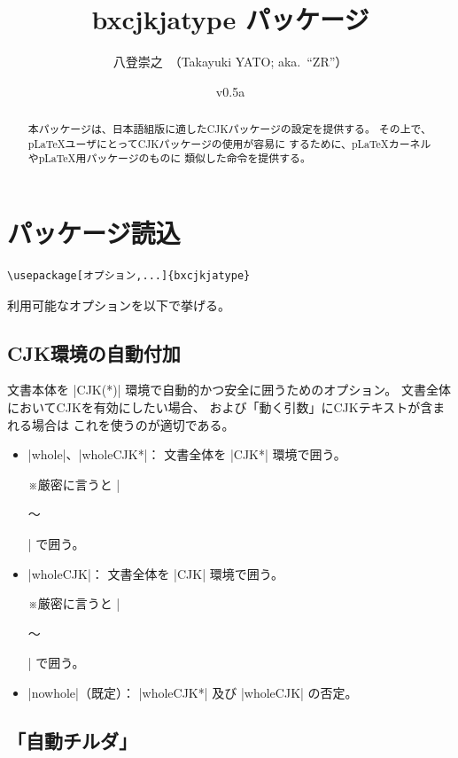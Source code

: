 \documentclass[a4paper]{ltjsarticle}
\newcommand{\PkgVersion}{0.5a}
\newcommand{\PkgDate}{2026/03/31}
\newcommand{\Pkg}[1]{\textsf{#1}}
\newcommand{\Note}{\par\noindent ※}
\newcommand{\Means}{：\quad}
\providecommand{\pLaTeX}{p\LaTeX}
\begin{document}
\title{\Pkg{bxcjkjatype} パッケージ}
\author{八登崇之\ （Takayuki YATO; aka.~``ZR''）}
\date{v\PkgVersion\quad[\PkgDate]}
\maketitle

\begin{abstract}
本パッケージは、日本語組版に適した\Pkg{CJK}パッケージの設定を提供する。
その上で、{\pLaTeX}ユーザにとって\Pkg{CJK}パッケージの使用が容易に
するために、{\pLaTeX}カーネルや{\pLaTeX}用パッケージのものに
類似した命令を提供する。
\end{abstract}

\tableofcontents

\section{パッケージ読込}
\label{sec:loading}

\begin{verbatim}
\usepackage[オプション,...]{bxcjkjatype}
\end{verbatim}

利用可能なオプションを以下で挙げる。

\subsection{CJK環境の自動付加}

文書本体を |CJK(*)| 環境で自動的かつ安全に囲うためのオプション。
文書全体においてCJKを有効にしたい場合、
および「動く引数」にCJKテキストが含まれる場合は
これを使うのが適切である。

\begin{itemize}
\item |whole|、|wholeCJK*|\Means
  文書全体を |CJK*| 環境で囲う。
  \Note 厳密に言うと |\begin{uCJK*}～\end{uCJK*}| で囲う。
\item |wholeCJK|\Means
  文書全体を |CJK| 環境で囲う。
  \Note 厳密に言うと |\begin{uCJK}～\end{uCJK}| で囲う。
\item |nowhole|（既定）\Means
  |wholeCJK*| 及び |wholeCJK| の否定。
\end{itemize}

\subsection{「自動チルダ」}
\end{document}
